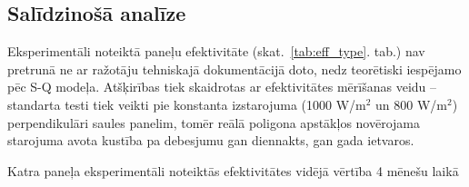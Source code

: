 \subsection{Salīdzinošā analīze}\label{subsection:effectivity}

Eksperimentāli noteiktā paneļu efektivitāte (skat.~\ref{tab:eff_type}. tab.) nav pretrunā ne ar ražotāju tehniskajā dokumentācijā doto, nedz teorētiski iespējamo pēc S-Q modeļa. 
Atšķirības tiek skaidrotas ar efektivitātes mērīšanas veidu -- standarta testi tiek veikti pie konstanta izstarojuma (1000 W/m$^2$ un 800 W/m$^2$) perpendikulāri saules panelim, tomēr reālā poligona apstākļos novērojama starojuma avota kustība pa debesjumu gan diennakts, gan gada ietvaros.

\begin{table}[h!]
    \caption{Katra paneļa eksperimentāli noteiktās efektivitātes vidējā vērtība 4 mēnešu laikā}
    \begin{center}
    
    \end{center}
    \label{tab:eff_type}
\end{table}

